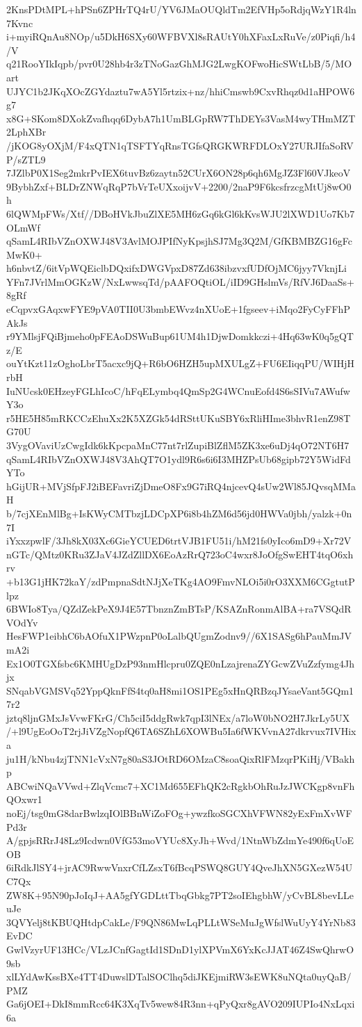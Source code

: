 2KnsPDtMPL+hPSn6ZPHrTQ4rU/YV6JMaOUQldTm2EfVHp5oRdjqWzY1R4ln7Kvnc
i+myiRQnAu8NOp/u5DkH6SXy60WFBVXl8sRAUtY0hXFaxLxRuVe/z0Piqfi/h4/V
q21RooYIkIqpb/pvr0U28hb4r3zTNoGazGhMJG2LwgKOFwoHicSWtLbB/5/MOart
UJYC1b2JKqXOcZGYdaztu7wA5Yl5rtzix+nz/hhiCmswb9CxvRhqz0d1aHPOW6g7
x8G+SKom8DXokZvafhqq6DybA7h1UmBLGpRW7ThDEYs3VasM4wyTHmMZT2LphXBr
/jKOG8yOXjM/F4xQTN1qTSFTYqRnsTGfsQRGKWRFDLOxY27URJIfaSoRVP/sZTL9
7JZlbP0X1Seg2mkrPvIEX6tuvBz6zaytn52CUrX6ON28p6qh6MgJZ3Fl60VJkeoV
9BybhZxf+BLDrZNWqRqP7bVrTeUXxoijvV+2200/2naP9F6kcsfrzcgMtUj8wO0h
6lQWMpFWs/Xtf//DBoHVkJbuZlXE5MH6zGq6kGl6kKvsWJU2lXWD1Uo7Kb7OLmWf
qSamL4RIbVZnOXWJ48V3AvlMOJPIfNyKpsjhSJ7Mg3Q2M/GfKBMBZG16gFcMwK0+
h6nbvtZ/6itVpWQEiclbDQxifxDWGVpxD87Zd638ibzvxfUDfOjMC6jyy7VknjLi
YFn7JVrlMmOGKzW/NxLwwsqTd/pAAFOQtiOL/iID9GHslmVs/RfVJ6DaaSs+8gRf
eCqpvxGAqxwFYE9pVA0TII0U3bmbEWvz4nXUoE+1fgseev+iMqo2FyCyFFhPAkJs
r9YMlsjFQiBjmeho0pFEAoDSWuBup61UM4h1DjwDomkkczi+4Hq63wK0q5gQTz/E
ouYtKzt11zOghoLbrT5acxc9jQ+R6bO6HZH5upMXULgZ+FU6EIiqqPU/WIHjHrbH
IuNUcsk0EHzeyFGLhIcoC/hFqELymbq4QmSp2G4WCnuEofd4S6sSIVu7AWufwY3o
r5HE5H85mRKCCzEhuXx2K5XZGk54dRSttUKuSBY6xRliHIme3bhvR1enZ98TG70U
3VygOVaviUzCwgIdk6kKpcpaMnC77nt7rlZupiBlZflM5ZK3xe6uDj4qO72NT6H7
qSamL4RIbVZnOXWJ48V3AhQT7O1ydl9R6s6i6I3MHZPsUb68gipb72Y5WidFdYTo
hGijUR+MVjSfpFJ2iBEFavriZjDmeO8Fx9G7iRQ4njcevQ4sUw2Wl85JQvsqMMaH
b/7cjXEnMlBg+IsKWyCMTbzjLDCpXP6i8b4hZM6d56jd0HWVa0jbh/yalzk+0n7I
iYxxzpwlF/3Jh8kX03Xc6GieYCUED6trtVJB1FU51i/hM21fs0yIco6mD9+Xr72V
nGTc/QMtz0KRu3ZJaV4JZdZllDX6EoAzRrQ723oC4wxr8JoOfgSwEHT4tqO6xhrv
+b13G1jHK72kaY/zdPmpnaSdtNJjXeTKg4AO9FmvNLOi5i0rO3XXM6CGgtutPlpz
6BWIo8Tya/QZdZekPeX9J4E57TbnznZmBTsP/KSAZnRonmAlBA+ra7VSQdRVOdYv
HesFWP1eibhC6bAOfuX1PWzpnP0oLalbQUgmZodnv9//6X1SASg6hPauMmJVmA2i
Ex1O0TGXfsbc6KMHUgDzP93nmHlcpru0ZQE0nLzajrenaZYGcwZVuZzfymg4Jhjx
SNqabVGMSVq52YppQknFfS4tq0aH8mi1OS1PEg5xHnQRBzqJYsaeVant5GQm17r2
jztq8ljnGMxJsVvwFKrG/Ch5ciI5ddgRwk7qpI3lNEx/a7loW0bNO2H7JkrLy5UX
/+l9UgEoOoT2rjJiVZgNopfQ6TA6SZhL6XOWBu5Ia6fWKVvnA27dkrvux7IVHixa
ju1H/kNbu4zjTNN1cVxN7g80aS3JOtRD6OMzaC8soaQixRlFMzqrPKiHj/VBakhp
ABCwiNQaVVwd+ZlqVcmc7+XC1Md655EFhQK2cRgkbOhRuJzJWCKgp8vnFhQOxwr1
noEj/tsg0mG8darBwlzqIOlBBnWiZoFOg+ywzfkoSGCXhVFWN82yExFmXvWFPd3r
A/gpjsRRrJ48Lz9Icdwn0VfG53moVYUc8XyJh+Wvd/1NtnWbZdmYe490f6qUoEOB
6iRdkJlSY4+jrAC9RwwVnxrCfLZsxT6fBcqPSWQ8GUY4QveJhXN5GXezW54UC7Qx
ZW8K+95N90pJoIqJ+AA5gfYGDLttTbqGbkg7PT2soIEhgbhW/yCvBL8bevLLeuJe
3QVYelj8tKBUQHtdpCakLe/F9QN86MwLqPLLtWSeMuJgWfslWuUyY4YrNb83EvDC
GwlVzyrUF13HCc/VLzJCnfGagtId1SDnD1ylXPVmX6YxKcJJAT46Z4SwQhrwO9sb
xlLYdAwKssBXe4TT4DuwslDTalSOClhq5diJKEjmiRW3sEWK8uNQta0uyQaB/PMZ
Ga6jOEI+DkI8mmRcc64K3XqTv5wew84R3nn+qPyQxr8gAVO209IUPIo4NxLqxi6a
